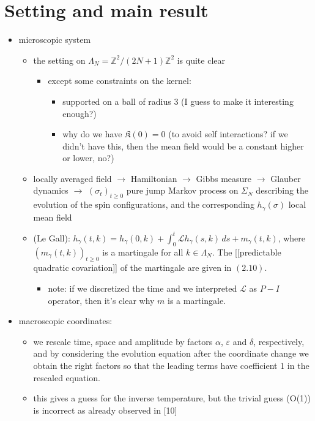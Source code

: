 \documentclass{report}
\theoremstyle{remark}
\theoremstyle{definition}
\let\epsilon\varepsilon
\begin{document}
\chapter{Setting and main result}
\begin{itemize}
  \item microscopic system
  \begin{itemize}
    \item the setting on $\Lambda_N = \mathbb{Z}^2 / (2N + 1)\mathbb{Z}^2$ is quite clear
    \begin{itemize}
      \item except some constraints on the kernel:
      \begin{itemize}
        \item supported on a ball of radius 3 (I guess to make it interesting enough?)
        \item why do we have $\mathfrak{K}(0) = 0$  (to avoid self interactions? if we didn't have this, then the mean field would be a constant higher or lower, no?)
      \end{itemize}
    \end{itemize}
    \item locally averaged field $\to$ Hamiltonian $\to$ Gibbs measure $\to$ Glauber dynamics $\to$ $(\sigma_t)_{t\ge 0}$ pure jump Markov process on $\Sigma_N$ describing the evolution of the spin configurations, and the corresponding $h_\gamma(\sigma)$ local mean field
    \item (Le Gall): $h_\gamma(t, k) = h_\gamma(0, k) + \int_0^t \mathcal{L} h_\gamma(s, k)\,ds + m_\gamma(t, k)$, where $(m_\gamma(t, k))_{t \ge 0}$ is a martingale for all $k \in \Lambda_N$. The [[predictable quadratic covariation]] of the martingale are given in $(2.10)$.
    \begin{itemize}
      \item note: if we discretized the time and we interpreted $\mathcal{L}$ as $P-I$ operator, then it's clear why $m$ is a martingale.
    \end{itemize}
  \end{itemize}
  \item macroscopic coordinates:
  \begin{itemize}
    \item we rescale time, space and amplitude by factors $\alpha$, $\epsilon$ and $\delta$, respectively, and by considering the evolution equation after the coordinate change we obtain the right factors so that the leading terms have coefficient 1 in the rescaled equation.
    \item this gives a guess for the inverse temperature, but the trivial guess (O(1)) is incorrect as already observed in [10]

\end{itemize}
\end{itemize}
\end{document}
